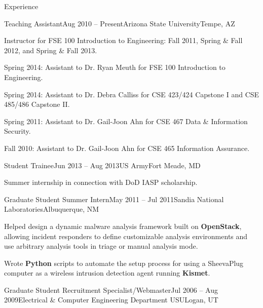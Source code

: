 \documentclass{resume} %
\begin{document}
\begin{rSection}{Experience}
\begin{rSubsection}{Teaching Assistant}{Aug 2010 -- Present}{Arizona State University}{Tempe, AZ}
	\item Instructor for FSE 100 Introduction to Engineering: Fall 2011, Spring \& Fall 2012, and Spring \& Fall 2013.

	\item Spring 2014: Assistant to Dr. Ryan Meuth for FSE 100 Introduction to Engineering.
	
	\item Spring 2014: Assistant to Dr. Debra Calliss for CSE 423/424 Capstone I and CSE 485/486 Capstone II.
	
	\item Spring 2011: Assistant to Dr. Gail-Joon Ahn for CSE 467 Data \& Information Security.
	
	\item Fall 2010: Assistant to Dr. Gail-Joon Ahn for CSE 465 Information Assurance.
	
\end{rSubsection}


\begin{rSubsection}{Student Trainee}{Jun 2013 -- Aug 2013}{US Army}{Fort Meade, MD}


	\item Summer internship in connection with DoD IASP scholarship.

\end{rSubsection}


\begin{rSubsection}{Graduate Student Summer Intern}{May 2011 -- Jul 2011}{Sandia National Laboratories}{Albuquerque, NM}

	\item Helped design a dynamic malware analysis framework built on \textbf{OpenStack}, allowing incident responders to define customizable analysis environments and use arbitrary analysis tools in triage or manual analysis mode.
	
	\item Wrote \textbf{Python} scripts to automate the setup process for using a SheevaPlug computer as a wireless intrusion detection agent running \textbf{Kismet}.

\end{rSubsection}


\begin{rSubsection}{Graduate Student Recruitment Specialist/Webmaster}{Jul 2006 -- Aug 2009}{Electrical \& Computer Engineering Department USU}{Logan, UT}


\end{rSubsection}
\end{rSection}
\end{document}
